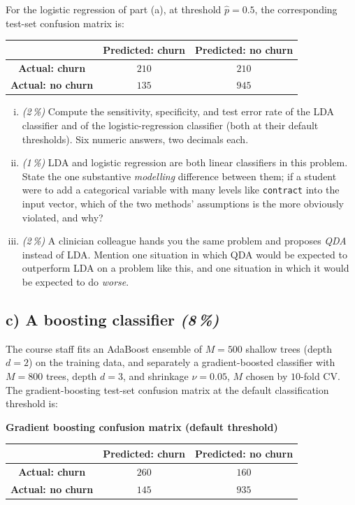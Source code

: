\documentclass[11pt,a4paper]{article}
\newcommand{\subpoints}[1]{\textit{(#1\,\%)}}
\begin{document}
For the logistic regression of part (a), at threshold $\hat p = 0.5$, the corresponding test-set confusion matrix is:
\begin{center}\small
\begin{tabular}{c|cc}
 & \textbf{Predicted: churn} & \textbf{Predicted: no churn} \\ \hline
\textbf{Actual: churn}    & $210$ & $210$ \\
\textbf{Actual: no churn} & $135$ & $945$ \\
\end{tabular}
\end{center}

\begin{enumerate}[(i)]
  \item \subpoints{2} Compute the sensitivity, specificity, and test error rate of the LDA classifier and of the logistic-regression classifier (both at their default thresholds). Six numeric answers, two decimals each.

  \item \subpoints{1} LDA and logistic regression are both linear classifiers in this problem. State the one substantive \emph{modelling} difference between them; if a student were to add a categorical variable with many levels like \texttt{contract} into the input vector, which of the two methods' assumptions is the more obviously violated, and why?

  \item \subpoints{2} A clinician colleague hands you the same problem and proposes \emph{QDA} instead of LDA. Mention one situation in which QDA would be expected to outperform LDA on a problem like this, and one situation in which it would be expected to do \emph{worse}.
\end{enumerate}

\subsection*{c) A boosting classifier \subpoints{8}}
The course staff fits an AdaBoost ensemble of $M = 500$ shallow trees (depth $d = 2$) on the training data, and separately a gradient-boosted classifier with $M = 800$ trees, depth $d = 3$, and shrinkage $\nu = 0.05$, $M$ chosen by $10$-fold CV. The gradient-boosting test-set confusion matrix at the default classification threshold is:

\begin{center}\small
\textbf{Gradient boosting confusion matrix (default threshold)} \\[0.3em]
\begin{tabular}{c|cc}
 & \textbf{Predicted: churn} & \textbf{Predicted: no churn} \\ \hline
\textbf{Actual: churn}    & $260$ & $160$ \\
\textbf{Actual: no churn} & $145$ & $935$ \\
\end{tabular}
\end{center}
\end{document}
